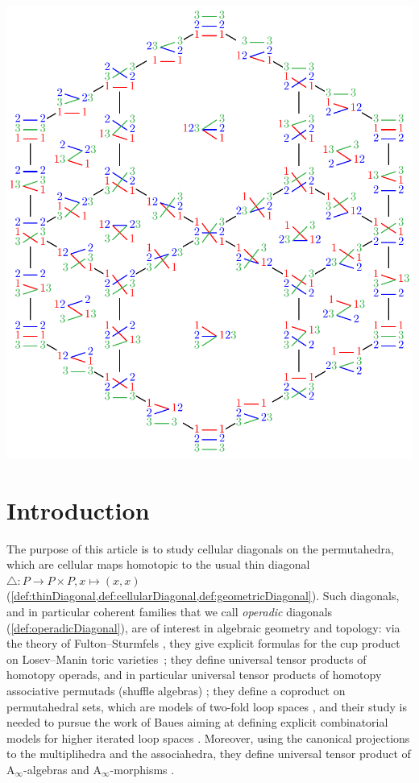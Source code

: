 \documentclass{amsart}
\theoremstyle{definition}
\newcommand{\Ainf}{\ensuremath{\mathrm{A}_\infty}}
\begin{document}
\vspace*{-.2cm}
\centerline{\includegraphics[scale=.8]{diagonalPermutahedron3}}

\newpage
\enlargethispage{1cm}
\tableofcontents


\newpage
\section*{Introduction} 
\label{s:introduction}

The purpose of this article is to study cellular diagonals on the permutahedra, which are cellular maps homotopic to the usual thin diagonal $\triangle : P \to P \times P, x \mapsto (x,x)$ (\cref{def:thinDiagonal,def:cellularDiagonal,def:geometricDiagonal}).
Such diagonals, and in particular coherent families that we call \emph{operadic} diagonals (\cref{def:operadicDiagonal}), are of interest in algebraic geometry and topology: via the theory of Fulton--Sturmfels \cite{FultonSturmfels}, they give explicit formulas for the cup product on Losev--Manin toric varieties~\cite{LosevManin}; they define universal tensor products of homotopy operads, and in particular universal tensor products of homotopy associative permutads (shuffle algebras) \cite{LaplanteAnfossi}; they define a coproduct on permutahedral sets, which are models of two-fold loop spaces \cite{SaneblidzeUmble}, and their study is needed to pursue the work of Baues aiming at defining explicit combinatorial models for higher iterated loop spaces \cite{Baues}. 
Moreover, using the canonical projections to the multiplihedra and the associahedra, they define universal tensor product of $\Ainf$-algebras and $\Ainf$-morphisms \cite{LaplanteAnfossiMazuir}.
\end{document}
